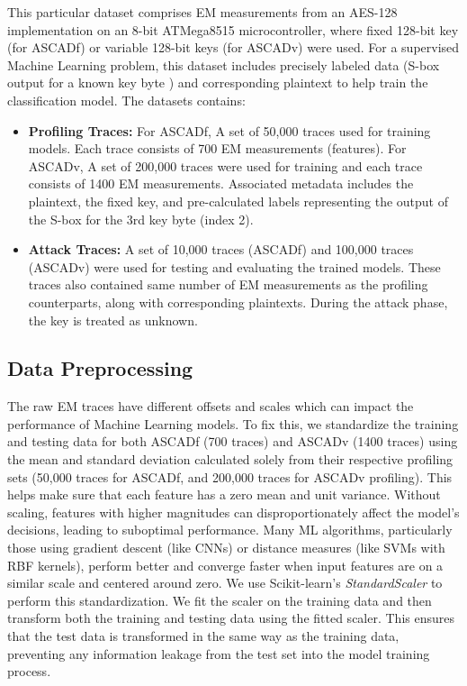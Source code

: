 \documentclass[runningheads]{llncs}
\begin{document}
This particular dataset comprises EM measurements from an AES-128 implementation on an 8-bit ATMega8515 microcontroller, where fixed 128-bit key (for ASCADf) or variable 128-bit keys (for ASCADv) were used. For a supervised Machine Learning problem, this dataset includes precisely labeled data (S-box output for a known key byte ) and corresponding plaintext to help train the classification model. The datasets contains:

\begin{itemize}
    \item \textbf{Profiling Traces:} For ASCADf, A set of 50,000 traces used for training models. Each trace consists of 700 EM measurements (features). For ASCADv, A set of 200,000 traces were used for training and each trace consists of 1400 EM measurements.  Associated metadata includes the plaintext, the fixed key, and pre-calculated labels representing the output of the S-box for the 3rd key byte (index 2).
    \item \textbf{Attack Traces:} A set of 10,000 traces (ASCADf) and 100,000 traces (ASCADv) were used for testing and evaluating the trained models. These traces also contained same number of EM measurements as the profiling counterparts, along with corresponding plaintexts. During the attack phase, the key is treated as unknown.
\end{itemize}


\subsection{Data Preprocessing}

The raw EM traces have different offsets and scales which can impact the performance of Machine Learning models. To fix this, we standardize the training and testing data for both ASCADf (700 traces) and ASCADv (1400 traces) using the mean and standard deviation calculated solely from their respective profiling sets (50,000 traces for ASCADf, and 200,000 traces for ASCADv profiling). This helps make sure that each feature has a zero mean and unit variance. Without scaling, features with higher magnitudes can disproportionately affect the model's decisions, leading to suboptimal performance. Many ML algorithms, particularly those using gradient descent (like CNNs) or distance measures (like SVMs with RBF kernels), perform better and converge faster when input features are on a similar scale and centered around zero. We use Scikit-learn's \textit{StandardScaler} to perform this standardization. We fit the scaler on the training data and then transform both the training and testing data using the fitted scaler. This ensures that the test data is transformed in the same way as the training data, preventing any information leakage from the test set into the model training process.
\end{document}

